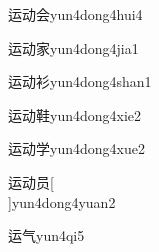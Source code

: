\begin{verbete}[7;6;6]{运动会}{yun4dong4hui4}
\end{verbete}

\begin{verbete}[7;6;10]{运动家}{yun4dong4jia1}
\end{verbete}

\begin{verbete}[7;6;8]{运动衫}{yun4dong4shan1}
\end{verbete}

\begin{verbete}[7;6;15]{运动鞋}{yun4dong4xie2}
\end{verbete}

\begin{verbete}[7;6;8]{运动学}{yun4dong4xue2}
\end{verbete}

\begin{verbete}[7;6;7]{运动员}[\\]{yun4dong4yuan2}
\end{verbete}

\begin{verbete}[7;4]{运气}{yun4qi5}
\end{verbete}


